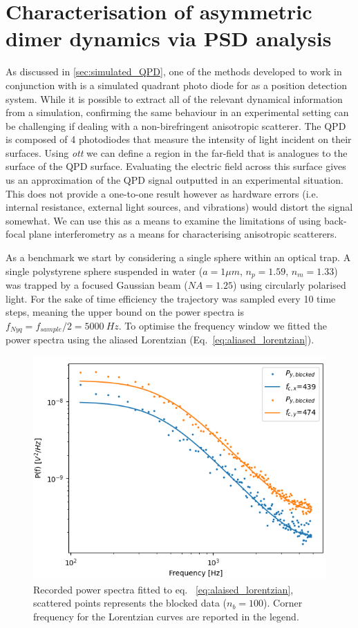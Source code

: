 \section{Characterisation of asymmetric dimer dynamics via PSD analysis}
As discussed in \ref{sec:simulated_QPD}, one of the methods 
developed to work in conjunction with \cite{Vigilante2020} 
is a simulated quadrant photo diode for as a position 
detection system. While it is possible to extract all of 
the relevant dynamical information from a simulation, 
confirming the same behaviour in an experimental setting 
can be challenging if dealing with a non-birefringent 
anisotropic scatterer. The QPD is composed of 4 photodiodes 
that measure the intensity of light incident on their 
surfaces. Using \textit{ott} we can define a region in the 
far-field that is analogues to the surface of the QPD surface. 
Evaluating the electric field across this surface gives us 
an approximation of the QPD signal outputted in an experimental 
situation. This does not provide a one-to-one result however 
as hardware errors (i.e. internal resistance, external light 
sources, and vibrations) would distort the signal somewhat. We 
can use this as a means to examine the limitations of using 
back-focal plane interferometry as a means for characterising 
anisotropic scatterers. 

As a benchmark we start by considering a single sphere within 
an optical trap. A single polystyrene sphere suspended in water 
($a=1\mu m$, $n_p=1.59$, $n_m=1.33$) was trapped by a focused 
Gaussian beam ($NA=1.25$) using circularly polarised light. For 
the sake of time efficiency the trajectory was sampled every 10
time steps, meaning the upper bound on the power spectra is
$f_{Nyq}=f_{sample}/2=5000\ Hz$. To optimise the frequency window
we fitted the power spectra using the aliased Lorentzian 
(Eq.~\eqref{eq:aliased_lorentzian}). 
\begin{figure}[h!]
	\centering
	\includegraphics[width=\linewidth]{PSD_sphere.png}
	\caption{Recorded power spectra fitted to eq.~
		\ref{eq:alaised_lorentzian}, scattered points represents 
		the blocked data ($n_b=100$). Corner frequency for the 
		Lorentzian curves are reported in the legend.}
	\label{fig:psd_sphere}
\end{figure} 

